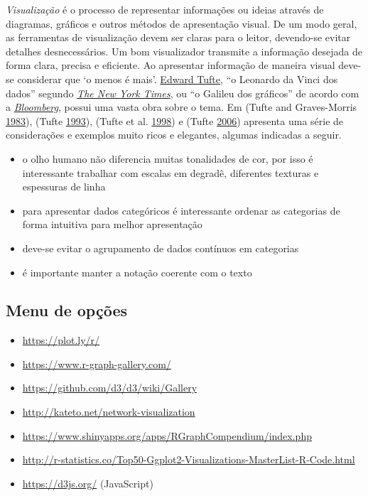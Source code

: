 \documentclass[
]{book}
\providecommand{\tightlist}{%
  \setlength{\itemsep}{0pt}\setlength{\parskip}{0pt}}
\theoremstyle{definition}
\theoremstyle{definition}
\theoremstyle{definition}
\theoremstyle{remark}
\begin{document}
\emph{Visualização} é o processo de representar informações ou ideias através de diagramas, gráficos e outros métodos de apresentação visual. De um modo geral, as ferramentas de visualização devem ser claras para o leitor, devendo-se evitar detalhes desnecessários. Um bom visualizador transmite a informação desejada de forma clara, precisa e eficiente. Ao apresentar informação de maneira visual deve-se considerar que `o menos é mais'. \href{https://www.edwardtufte.com/}{Edward Tufte}, ``o Leonardo da Vinci dos dados'' segundo \href{https://www.nytimes.com/}{\emph{The New York Times}}, ou ``o Galileu dos gráficos'' de acordo com a \href{https://www.bloomberg.com/}{\emph{Bloomberg}}, possui uma vasta obra sobre o tema. Em (Tufte and Graves-Morris \protect\hyperlink{ref-tufte1983visual}{1983}), (Tufte \protect\hyperlink{ref-tufte1993envisioning}{1993}), (Tufte et al. \protect\hyperlink{ref-tufte1998visual}{1998}) e (Tufte \protect\hyperlink{ref-tufte2006beautiful}{2006}) apresenta uma série de considerações e exemplos muito ricos e elegantes, algumas indicadas a seguir.

\begin{itemize}
\tightlist
\item
  o olho humano não diferencia muitas tonalidades de cor, por isso é interessante trabalhar com escalas em degradê, diferentes texturas e espessuras de linha\\
\item
  para apresentar dados categóricos é interessante ordenar as categorias de forma intuitiva para melhor apresentação\\
\item
  deve-se evitar o agrupamento de dados contínuos em categorias\\
\item
  é importante manter a notação coerente com o texto
\end{itemize}

\hypertarget{menu-de-opuxe7uxf5es}{%
\subsection{Menu de opções}\label{menu-de-opuxe7uxf5es}}

\begin{itemize}
\tightlist
\item
  \url{https://plot.ly/r/}
\item
  \url{https://www.r-graph-gallery.com/}
\item
  \url{https://github.com/d3/d3/wiki/Gallery}
\item
  \url{http://kateto.net/network-visualization}
\item
  \url{https://www.shinyapps.org/apps/RGraphCompendium/index.php}
\item
  \url{http://r-statistics.co/Top50-Ggplot2-Visualizations-MasterList-R-Code.html}
\item
  \url{https://d3js.org/} (JavaScript)
\end{itemize}
\end{document}
